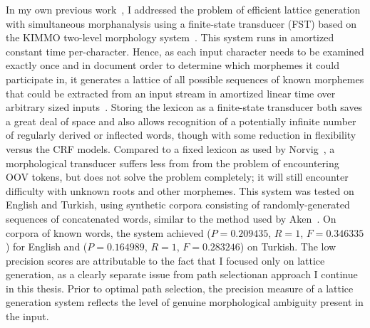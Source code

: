 
In my own previous work~\cite{kearsley13}, I addressed the problem of efficient lattice generation with simultaneous morphanalysis using a finite-state transducer (FST) based on the KIMMO two-level morphology system~\cite{koskenniemi84}. This system runs in amortized constant time per-character. Hence, as each input character needs to be examined exactly once and in document order to determine which morphemes it could participate in, it generates a lattice of all possible sequences of known morphemes that could be extracted from an input stream in amortized linear time over arbitrary sized inputs~\cite{kearsley13}. Storing the lexicon as a finite-state transducer both saves a great deal of space and also allows recognition of a potentially infinite number of regularly derived or inflected words, though with some reduction in flexibility versus the CRF models. Compared to a fixed lexicon as used by Norvig~\cite{norvig14}, a morphological transducer suffers less from from the problem of encountering OOV tokens, but does not solve the problem completely; it will still encounter difficulty with unknown roots and other morphemes. This system was tested on English and Turkish, using synthetic corpora consisting of randomly-generated sequences of concatenated words, similar to the method used by Aken~\cite{aken11}. On corpora of known words, the system achieved ($P = 0.209435$, $R = 1$, $F = 0.346335$) for English and ($P = 0.164989$, $R = 1$, $F = 0.283246$) on Turkish.  The low precision scores are attributable to the fact that I focused only on lattice generation, as a clearly separate issue from path selection\textemdash an approach I continue in this thesis. Prior to optimal path selection, the precision measure of a lattice generation system reflects the level of genuine morphological ambiguity present in the input.

